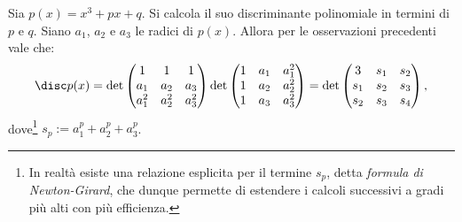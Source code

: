 \documentclass[11pt]{scrartcl}
\begin{document}
\begin{remark}
	Sia $p(x) = x^3 + px + q$. Si calcola il suo discriminante polinomiale
	in termini di $p$ e $q$. Siano $a_1$, $a_2$ e $a_3$ le radici di $p(x)$.
	Allora per le osservazioni precedenti vale che:
	\[ \disc p(x) = \det \begin{pmatrix}
		1 & 1 & 1 \\ a_1 & a_2 & a_3 \\ a_1^2 & a_2^2 & a_3^2
	\end{pmatrix} \det \begin{pmatrix} 1 & a_1 & a_1^2 \\ 1 & a_2 & a_2^2 \\ 1 & a_3 & a_3^2 \end{pmatrix} = \det \begin{pmatrix}
		3 & s_1 & s_2 \\ s_1 & s_2 & s_3 \\ s_2 & s_3 & s_4 
	\end{pmatrix},\]
	dove\footnote{
		In realtà esiste una relazione esplicita per il termine $s_p$, detta
		\textit{formula di Newton-Girard}, che dunque permette di estendere i calcoli
		successivi a gradi più alti con più efficienza.
	} $s_p := a_1^p + a_2^p + a_3^p$. \medskip
	

\end{remark}
\end{document}
